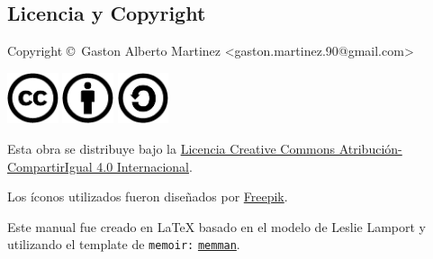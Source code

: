 \documentclass[10pt,letterpaper,extrafontsizes]{memoir}
\begin{document}
\backmatter

\pagestyle{index}
\renewcommand{\preindexhook}{%
The first page number is usually, but not always, the primary reference to
the indexed topic.\vskip\onelineskip}
\indexintoc

\printindex

\onecolindex

\pagestyle{empty}
\null\vfil

\begin{adjustwidth}{0in}{0in}
\chapter{Licencia y Copyright}



{\noindent
Copyright \copyright\ Gaston Alberto Martinez <gaston.martinez.90@gmail.com> \\
}

\begin{center}
\noindent
\includegraphics[height=1.5cm]{graficos/cc/cc}
\hspace{0.5cm}
\includegraphics[height=1.5cm]{graficos/cc/by}
\hspace{0.5cm}
\includegraphics[height=1.5cm]{graficos/cc/sa}
\end{center}

Esta obra se distribuye bajo la
\href{http://creativecommons.org/licenses/by-sa/4.0/deed.es}{Licencia Creative
Commons Atribución-CompartirIgual 4.0 Internacional}.

Los íconos utilizados fueron diseñados por
\href{http://www.freepik.com/}{Freepik}.

Este manual fue creado en LaTeX  basado en el modelo de Leslie Lamport y utilizando el template de \texttt{memoir:} \href{http://texdoc.net/texmf-dist/doc/latex/memoir/memman.tex}{\texttt{memman}}. 

\end{adjustwidth}

\vfil
\end{document}
